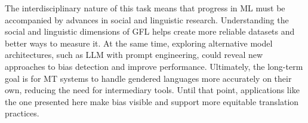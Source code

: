    The interdisciplinary nature of this task means that progress in ML must be accompanied by advances in social and linguistic research. Understanding the social and linguistic dimensions of GFL helps create more reliable datasets and better ways to measure it. At the same time, exploring alternative model architectures, such as LLM with prompt engineering, could reveal new approaches to bias detection and improve performance. Ultimately, the long-term goal is for MT systems to handle gendered languages more accurately on their own, reducing the need for intermediary tools. Until that point, applications like the one presented here make bias visible and support more equitable translation practices.
